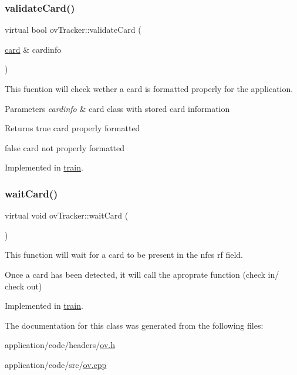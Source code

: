 \subsubsection{\texorpdfstring{validate\+Card()}{validateCard()}}
{\footnotesize\ttfamily virtual bool ov\+Tracker\+::validate\+Card (\begin{DoxyParamCaption}\item[{\hyperlink{classcard}{card} \&}]{cardinfo }\end{DoxyParamCaption})\hspace{0.3cm}{\ttfamily [pure virtual]}}



This fucntion will check wether a card is formatted properly for the application. 


\begin{DoxyParams}{Parameters}
{\em cardinfo} & card class with stored card information \\
\hline
\end{DoxyParams}
\begin{DoxyReturn}{Returns}
true card properly formatted 

false card not properly formatted 
\end{DoxyReturn}


Implemented in \hyperlink{classtrain_aa484ea80f6754481e8c566da13c72f82}{train}.

\mbox{\label{classovTracker_a43dea6c5e524377f2190e59a7da85b51}} 
\subsubsection{\texorpdfstring{wait\+Card()}{waitCard()}}
{\footnotesize\ttfamily virtual void ov\+Tracker\+::wait\+Card (\begin{DoxyParamCaption}{ }\end{DoxyParamCaption})\hspace{0.3cm}{\ttfamily [pure virtual]}}



This function will wait for a card to be present in the nfc\textquotesingle{}s rf field. 

Once a card has been detected, it will call the aproprate function (check in/ check out) 

Implemented in \hyperlink{classtrain_a4509fc35ff69717aab2636dd847981d4}{train}.



The documentation for this class was generated from the following files\+:\begin{DoxyCompactItemize}
\item 
application/code/headers/\hyperlink{ov_8h}{ov.\+h}\item 
application/code/src/\hyperlink{ov_8cpp}{ov.\+cpp}\end{DoxyCompactItemize}
